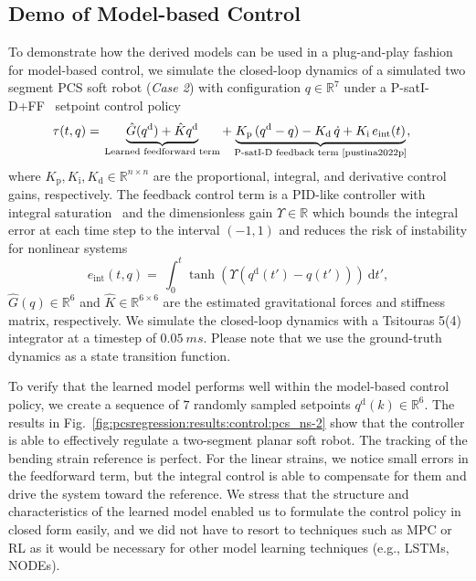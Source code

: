 \subsection{Demo of Model-based Control}\label{sub:pcsregression:validation:model_based_control}
To demonstrate how the derived models can be used in a plug-and-play fashion for model-based control, we simulate the closed-loop dynamics of a simulated two segment \gls{PCS} soft robot (\emph{Case 2}) with configuration $q \in \mathbb{R}^7$ under a P-satI-D+FF~\cite{della2023model, stolzle2024experimental, stolzle2024input} setpoint control policy
\begin{equation}
\begin{split}
    \tau(t, q) =& \: \underbrace{\hat{G}(q^\mathrm{d})+\hat{K}q^\mathrm{d}}_{\text{Learned feedforward term}} + \underbrace{K_\mathrm{p} \, (q^\mathrm{d} - q) - K_\mathrm{d} \, \dot{q} + K_\mathrm{i} \, e_\mathrm{int}(t) }_{\text{P-satI-D feedback term~\cite{pustina2022p}}},
\end{split}
\end{equation}
where $K_\mathrm{p}, K_\mathrm{i}, K_\mathrm{d} \in \mathbb{R}^{n \times n}$ are the proportional, integral, and derivative control gains, respectively.
The feedback control term is a PID-like controller with integral saturation~\cite{pustina2022p} and the dimensionless gain $\Upsilon \in \mathbb{R}$ which bounds the integral error at each time step to the interval $(-1, 1)$ and reduces the risk of instability for nonlinear systems
\begin{equation}
    e_\mathrm{int}(t, q) = \:  \int_0^t \tanh(\Upsilon (q^\mathrm{d}(t') - q(t'))) \: \mathrm{d}t',
\end{equation}
$\hat{G}(q) \in \mathbb{R}^{6}$ and $\hat{K} \in \mathbb{R}^{6 \times 6}$ are the estimated gravitational forces and stiffness matrix, respectively.
We simulate the closed-loop dynamics with a Tsitouras 5(4) integrator at a timestep of $\SI{0.05}{ms}$.
Please note that we use the ground-truth dynamics as a state transition function.

To verify that the learned model performs well within the model-based control policy, we create a sequence of $7$ randomly sampled setpoints $q^\mathrm{d}(k) \in \mathbb{R}^6$. %
The results in Fig.~\ref{fig:pcsregression:results:control:pcs_ns-2} show that the controller is able to effectively regulate a two-segment planar soft robot.%
The tracking of the bending strain reference is perfect. For the linear strains, we notice small errors in the feedforward term, but the integral control is able to compensate for them and drive the system toward the reference.
We stress that the structure and characteristics of the learned model enabled us to formulate the control policy in closed form easily, and we did not have to resort to techniques such as \gls{MPC} or \gls{RL} as it would be necessary for other model learning techniques (e.g., \glspl{LSTM}, \glspl{NODE}).